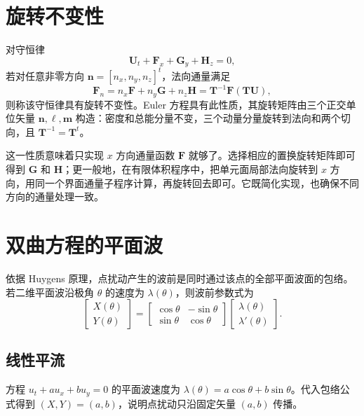 \documentclass[11pt,a4paper,openany,fontset=none]{ctexbook}
\begin{document}
\section{旋转不变性}

对守恒律
\begin{equation}
 \bm U_t+\bm F_x+\bm G_y+\bm H_z=0, \tag{1.20.1}
\end{equation}
若对任意非零方向 $\bm n=[n_x,n_y,n_z]^t$，法向通量满足
\begin{equation}
 \bm F_n=n_x\bm F+n_y\bm G+n_z\bm H=\bm T^{-1}\bm F(\bm T\bm U), \tag{1.20.2}
\end{equation}
则称该守恒律具有旋转不变性。Euler 方程具有此性质，其旋转矩阵由三个正交单位矢量 $\bm n,\bm\ell,\bm m$ 构造：密度和总能分量不变，三个动量分量旋转到法向和两个切向，且 $\bm T^{-1}=\bm T^t$。

这一性质意味着只实现 $x$ 方向通量函数 $\bm F$ 就够了。选择相应的置换旋转矩阵即可得到 $\bm G$ 和 $\bm H$；更一般地，在有限体积程序中，把单元面局部法向旋转到 $x$ 方向，用同一个界面通量子程序计算，再旋转回去即可。它既简化实现，也确保不同方向的通量处理一致。

\section{双曲方程的平面波}

依据 Huygens 原理，点扰动产生的波前是同时通过该点的全部平面波面的包络。若二维平面波沿极角 $\theta$ 的速度为 $\lambda(\theta)$，则波前参数式为
\begin{equation}
 \begin{bmatrix}X(\theta)\\Y(\theta)\end{bmatrix}=
 \begin{bmatrix}\cos\theta&-\sin\theta\\\sin\theta&\cos\theta\end{bmatrix}
 \begin{bmatrix}\lambda(\theta)\\\lambda'(\theta)\end{bmatrix}. \tag{1.21.1}
\end{equation}

\subsection*{线性平流}
方程 $u_t+a u_x+b u_y=0$ 的平面波速度为 $\lambda(\theta)=a\cos\theta+b\sin\theta$。代入包络公式得到 $(X,Y)=(a,b)$，说明点扰动只沿固定矢量 $(a,b)$ 传播。
\end{document}
